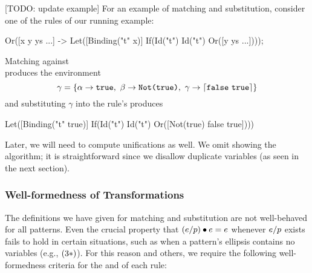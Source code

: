 [TODO: update example]
For an example of matching and substitution, consider one of the rules of
our running  example:
\begin{Codes}
Or([x y ys ...] ->
  Let([Binding("t" x)]
      If(Id("t") Id("t") Or([y ys ...])));
\end{Codes}
Matching 
against \\ 
produces the environment
\[\gamma = \{
   \alpha \to \texttt{true},\
   \beta \to \texttt{Not(true)},\
   \gamma \to \lceil \texttt{false}\ \texttt{true} \rceil\}\]
and substituting $\gamma$ into the rule's  produces
\begin{Codes}
Let([Binding("t" true)]
    If(Id("t") Id("t") Or([Not(true) false true])))
\end{Codes}

Later, we will need to compute unifications as well. We omit showing the
algorithm; it is straightforward since we disallow duplicate variables (as
seen in the next section).

\subsubsection{Well-formedness of Transformations}
\label{sec:wf}

The definitions we have given for matching and substitution are not
well-behaved for all patterns. Even the crucial property that
$(e / p) \bullet e = e$ whenever $e / p$ exists fails to hold in certain
situations, such as when a pattern's ellipsis contains no variables (e.g.,
$(3*)$). For this reason and others, we require the following
well-formedness criteria for the \Sc{lhs} and \Sc{rhs} of each rule:

